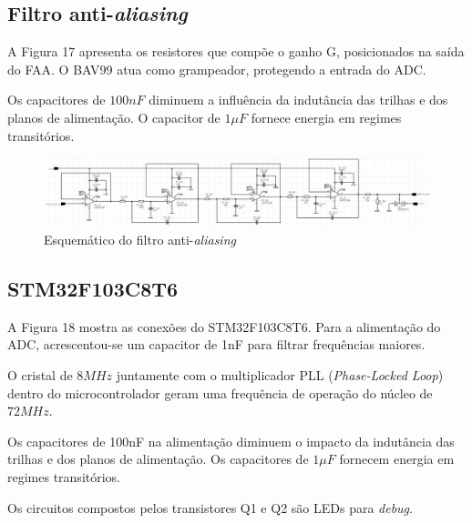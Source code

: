 \documentclass[11pt]{abntex2}
\begin{document}
				\subsection{Filtro anti-\textit{aliasing}}

					A Figura 17 apresenta os resistores que compõe o ganho G,
					posicionados na saída do FAA. O BAV99 atua como grampeador,
					protegendo a entrada do ADC.

					Os capacitores de $100nF$ diminuem a influência da
					indutância das trilhas e dos planos de alimentação. O
					capacitor de $1\mu F$ fornece energia em regimes
					transitórios.

					\begin{landscape}
						\vspace*{\fill}
						\begin{center}
							\begin{figure}[!h]
								\centering
								\includegraphics[scale = 0.8]{../Fotos/FAAesquematico.jpg}
								\caption{Esquemático do filtro anti-\textit{aliasing}}
							\end{figure}
						\end{center}
						\vspace*{\fill}
						
					\end{landscape}

				\subsection{STM32F103C8T6}

					A Figura 18 mostra as conexões do STM32F103C8T6. Para a
					alimentação do ADC, acrescentou-se um capacitor de 1nF para
					filtrar frequências maiores.

					O cristal de $8MHz$ juntamente com o multiplicador PLL
					(\textit{Phase-Locked Loop}) dentro do microcontrolador
					geram uma frequência de operação do núcleo de $72MHz$.

					Os capacitores de 100nF na alimentação diminuem o impacto
					da indutância das trilhas e dos planos de alimentação. Os
					capacitores de $1\mu F$ fornecem energia em regimes
					transitórios.

					Os circuitos compostos pelos transistores Q1 e Q2 são LEDs
					para \textit{debug}.
\end{document}
